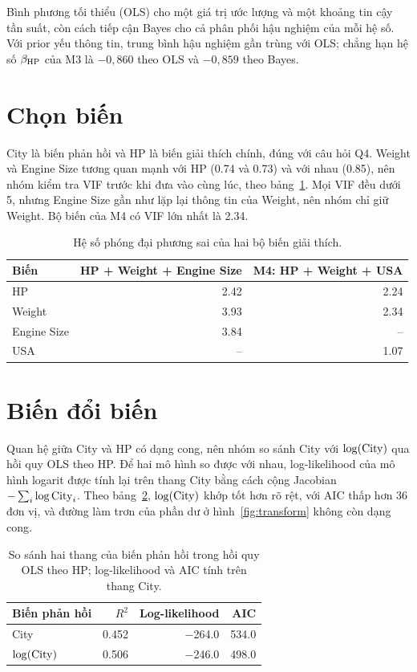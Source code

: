\documentclass[12pt,a4paper]{report}
\begin{document}
Bình phương tối thiểu (OLS) cho một giá trị ước lượng và một khoảng tin cậy tần
suất, còn cách tiếp cận Bayes cho cả phân phối hậu nghiệm của mỗi hệ số. Với
prior yếu thông tin, trung bình hậu nghiệm gần trùng với OLS; chẳng hạn hệ số
$\beta_{\mathrm{HP}}$ của M3 là $-0{,}860$ theo OLS và $-0{,}859$ theo Bayes.

\section{Chọn biến}

City là biến phản hồi và HP là biến giải thích chính, đúng với câu hỏi Q4.
Weight và Engine Size tương quan mạnh với HP (\num{0.74} và \num{0.73}) và với
nhau (\num{0.85}), nên nhóm kiểm tra VIF trước khi đưa vào cùng lúc, theo
bảng~\ref{tab:vif}. Mọi VIF đều dưới 5, nhưng Engine Size gần như lặp lại thông
tin của Weight, nên nhóm chỉ giữ Weight. Bộ biến của M4 có VIF lớn nhất là
\num{2.34}.

\begin{table}[tp]
  \centering
  \caption{Hệ số phóng đại phương sai của hai bộ biến giải thích.}
  \label{tab:vif}
  \begin{tabular}{lrr}
    \toprule
    Biến & HP + Weight + Engine Size & M4: HP + Weight + USA \\
    \midrule
    HP          & \num{2.42} & \num{2.24} \\
    Weight      & \num{3.93} & \num{2.34} \\
    Engine Size & \num{3.84} & -- \\
    USA         & --         & \num{1.07} \\
    \bottomrule
  \end{tabular}
\end{table}

\section{Biến đổi biến}
\label{sec:transform}

Quan hệ giữa City và HP có dạng cong, nên nhóm so sánh City với $\log(\mathrm{City})$
qua hồi quy OLS theo HP. Để hai mô hình so được với nhau, log-likelihood của mô
hình logarit được tính lại trên thang City bằng cách cộng Jacobian
$-\sum_i \log \mathrm{City}_i$. Theo bảng~\ref{tab:transform}, $\log(\mathrm{City})$ khớp tốt
hơn rõ rệt, với AIC thấp hơn 36 đơn vị, và đường làm trơn của phần dư ở
hình~\ref{fig:transform} không còn dạng cong.

\begin{table}[tp]
  \centering
  \caption{So sánh hai thang của biến phản hồi trong hồi quy OLS theo HP;
    log-likelihood và AIC tính trên thang City.}
  \label{tab:transform}
  \begin{tabular}{lrrr}
    \toprule
    Biến phản hồi & $R^2$ & Log-likelihood & AIC \\
    \midrule
    City         & \num{0.452} & \num{-264.0} & \num{534.0} \\
    $\log(\mathrm{City})$ & \num{0.506} & \num{-246.0} & \num{498.0} \\
    \bottomrule
  \end{tabular}
\end{table}
\end{document}
